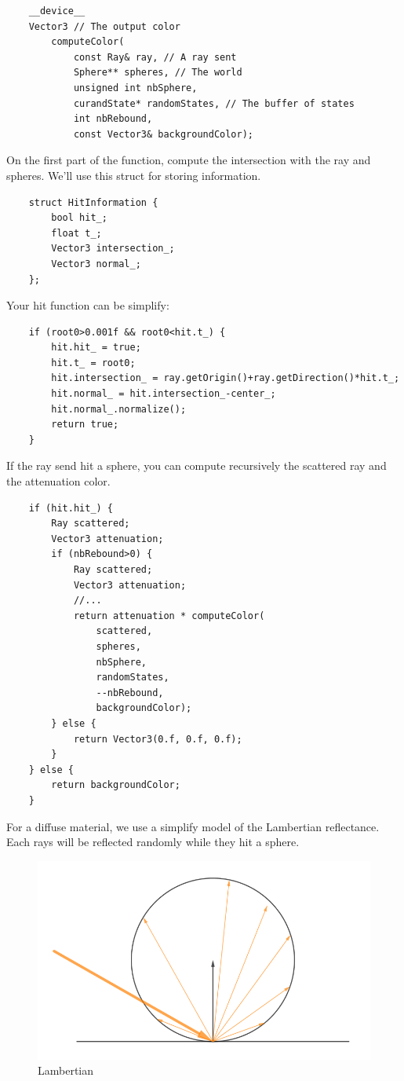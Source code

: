 \documentclass{article}
\begin{document}
\begin{lstlisting}
	__device__
	Vector3 // The output color
		computeColor(
			const Ray& ray, // A ray sent
			Sphere** spheres, // The world
			unsigned int nbSphere,
			curandState* randomStates, // The buffer of states
			int nbRebound,
			const Vector3& backgroundColor);
\end{lstlisting}
On the first part of the function, compute the intersection with the ray and spheres. We'll use this struct for storing information.
\begin{lstlisting}
	struct HitInformation {
		bool hit_;
		float t_;
		Vector3 intersection_;
		Vector3 normal_;
	};
\end{lstlisting}
Your hit function can be simplify:
\begin{lstlisting}
	if (root0>0.001f && root0<hit.t_) {
		hit.hit_ = true;
		hit.t_ = root0;
		hit.intersection_ = ray.getOrigin()+ray.getDirection()*hit.t_;
		hit.normal_ = hit.intersection_-center_;
		hit.normal_.normalize();
		return true;
	}
\end{lstlisting}
If the ray send hit a sphere, you can compute recursively the scattered ray and the attenuation color. 
\begin{lstlisting}
	if (hit.hit_) {
		Ray scattered;
		Vector3 attenuation;
		if (nbRebound>0) {
			Ray scattered;
			Vector3 attenuation;
			//...
			return attenuation * computeColor(
				scattered,
				spheres,
				nbSphere,
				randomStates,
				--nbRebound,
				backgroundColor);
		} else {
			return Vector3(0.f, 0.f, 0.f);
		}
	} else {
		return backgroundColor;
	}
\end{lstlisting}
For a diffuse material, we use a simplify model of the Lambertian reflectance. Each rays will be reflected randomly while they hit a sphere.
\begin{figure}[h]
	\centering
	\includegraphics[scale=0.47]{figures/diffuse.png}
	\caption{Lambertian}
\end{figure}
\end{document}
